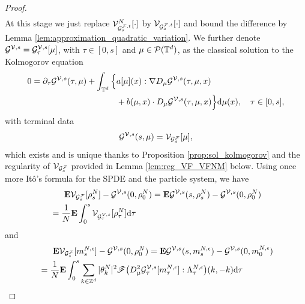 \begin{proof}
\begin{equation}
\begin{split}
\end{split}
\end{equation}
At this stage we just replace $\mathcal{V}^N_{\mathcal{G}^{\mathcal{F},t}_s}[\cdot]$ by $\mathcal{V}_{\mathcal{G}^{\mathcal{F},t}_s}[\cdot]$ and bound the difference by Lemma \ref{lem:approximation_quadratic_variation}. We further denote $\mathcal{G}^{\mathcal{V},s} = \mathcal{G}^{\mathcal{V},s}_{\tau}[\mu]$, with $\tau \in [0,s]$ and $\mu \in \mathcal{P}(\mathbb{T}^d)$, as the classical solution to the Kolmogorov equation
\begin{align*}
0 = \partial_{\tau} \mathcal{G}^{\mathcal{V},s}(\tau,\mu) + \int_{\mathbb{T}^d} \Big\{&a[\mu](x):\nabla D_{\mu}\mathcal{G}^{\mathcal{V},s}(\tau,\mu,x)\\
& + b(\mu,x)\cdot D_{\mu}\mathcal{G}^{\mathcal{V},s}(\tau,\mu,x)\Big\}\mathrm{d}\mu(x), \quad \tau \in [0,s],
\end{align*}
with terminal data 
\[
\mathcal{G}^{\mathcal{V},s}(s,\mu) = \mathcal{V}_{\mathcal{G}^{\mathcal{F}}_s}[\mu],
\]
which exists and is unique thanks to Proposition \ref{prop:sol_kolmogorov} and the regularity of $\mathcal{V}_{\mathcal{G}^{\mathcal{F}}_s}$ provided in Lemma \ref{lem:reg_VF_VFNM} below. Using once more It\^o's formula for the SPDE and the particle system, we have
\begin{equation}\label{eq:kol_2}
\begin{split}
    & \quad \ \ \mathbf{E}\mcl{V}_{\mcl{G}^{\mcl{F}}_s}[\rho_{s}^N] - \mcl{G}^{\mcl{V},s}(0,\rho^N_0) = \mathbf{E}\mcl{G}^{\mcl{V},s}(s,\rho_{s}^N) - \mcl{G}^{\mcl{V},s}(0,\rho^N_0)\\
    & = \frac1N \mathbf{E} \int_0^s \mcl{V}_{\mcl{G}^{\mcl{V},s}_\tau}[\rho^N_\tau]\mathrm{d}\tau%
\end{split}
\end{equation}
 and 
 \begin{equation}\label{eq:kol_3}
 \begin{split}
   & \quad \ \ \mathbf{E}\mcl{V}_{\mcl{G}^{\mcl{F}}_s}[m_s^{N,\epsilon}] - \mcl{G}^{\mcl{V},s}(0,\rho^N_0) = \mathbf{E}\mcl{G}^{\mcl{V},s}(s,m_s^{N,\epsilon}) - \mcl{G}^{\mcl{V},s}(0,m_0^{N,\epsilon}) \\
    & = \frac{1}{N} \mathbf{E}\int_0^{s} \sum_{k \in \mathbb{Z}^d}|\theta^N_k|^2 \mathscr{F}\big(D^2_{\mu}\mcl{G}_{\tau}^{\mcl{V},s}[m_{\tau}^{N,\epsilon}] : \Lambda^{N,\epsilon}_{\tau}\big)(k,-k)\mathrm{d}\tau\\

\end{split}
\end{equation}
\end{proof}
